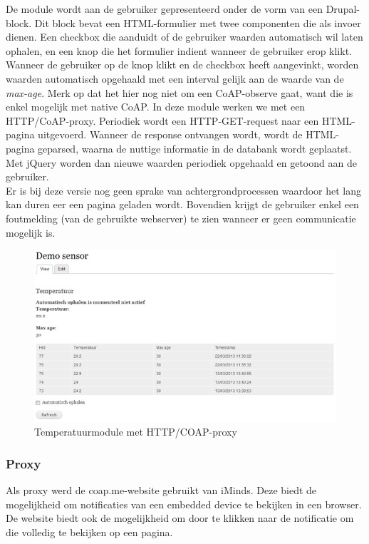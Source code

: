De module wordt aan de gebruiker gepresenteerd onder de vorm van een Drupal-block. Dit block bevat een HTML-formulier met twee componenten die als invoer dienen. Een checkbox die aanduidt of de gebruiker waarden automatisch wil laten ophalen, en een knop die het formulier indient wanneer de gebruiker erop klikt.\\
Wanneer de gebruiker op de knop klikt en de checkbox heeft aangevinkt, worden waarden automatisch opgehaald met een interval gelijk aan de waarde van de \textit{max-age}. Merk op dat het hier nog niet om een CoAP-observe gaat, want die is enkel mogelijk met native CoAP. In deze module werken we met een HTTP/CoAP-proxy. Periodiek wordt een HTTP-GET-request naar een HTML-pagina uitgevoerd. Wanneer de response ontvangen wordt, wordt de HTML-pagina geparsed, waarna de nuttige informatie in de databank wordt geplaatst. Met jQuery worden dan nieuwe waarden periodiek opgehaald en getoond aan de gebruiker.\\

Er is bij deze versie nog geen sprake van achtergrondprocessen waardoor het lang kan duren eer een pagina geladen wordt. Bovendien krijgt de gebruiker enkel een foutmelding (van de gebruikte webserver) te zien wanneer er geen communicatie mogelijk is.

\begin{figure}[h!]
\vspace{10pt}
\includegraphics[width=1\textwidth]{fig/TemperatuurModuleHTTPCOAPProxy}
\vspace{-30pt}
\caption{Temperatuurmodule met HTTP/COAP-proxy}
\vspace{-10pt}
\end{figure}

\subsubsection{Proxy}
Als proxy werd de coap.me-website \cite{coapMe} gebruikt van iMinds. Deze biedt de mogelijkheid om notificaties van een embedded device te bekijken in een browser. De website biedt ook de mogelijkheid om door te klikken naar de notificatie om die volledig te bekijken op een pagina.\\

